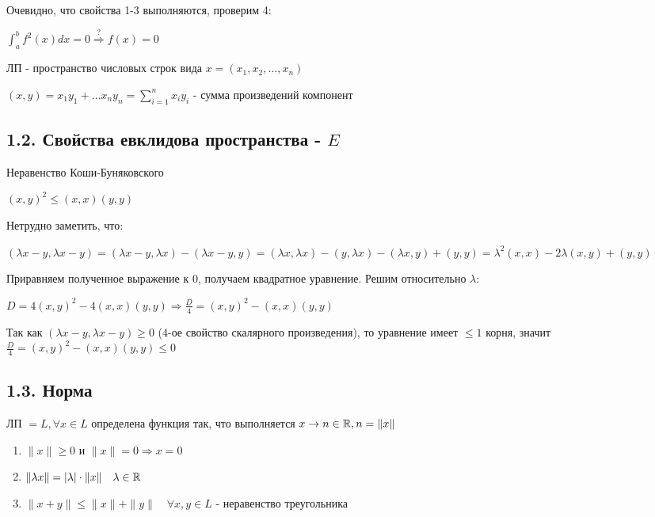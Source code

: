 \documentclass[12pt]{article}
\begin{document}
    Очевидно, что свойства 1-3 выполняются, проверим 4:

    $\int^b_a f^2(x) dx = 0 \stackrel{?}{\Longrightarrow} f(x) = 0$

     ЛП - пространство числовых строк вида $x = (x_1, x_2, \dots, x_n)$

    $(x, y) = x_1 y_1 + \dots x_n y_n = \sum_{i=1}^n x_i y_i$ - сумма произведений компонент

    \subsection{1.2. Свойства евклидова пространства - $E$}

    \hypertarget{inequalityofCauchyBunyakovsky}{}

    \begin{MyTheorem}
        \Ths Неравенство Коши-Буняковского

        $(x, y)^2 \leq (x, x)(y, y)$
    \end{MyTheorem}

    \begin{MyProof}
        Нетрудно заметить, что:

        $(\lambda x - y, \lambda x - y) = (\lambda x - y, \lambda x) - (\lambda x - y, y) =
        (\lambda x, \lambda x) - (y, \lambda x) - (\lambda x, y) + (y, y) = \lambda^2 (x, x) - 2\lambda (x, y) + (y, y)$

        Приравняем полученное выражение к 0, получаем квадратное уравнение. Решим относительно $\lambda$:

        $D = 4(x, y)^2 - 4(x, x)(y, y) \Longrightarrow \frac{D}{4} = (x, y)^2 - (x, x)(y, y)$

        Так как $(\lambda x - y, \lambda x - y) \geq 0$ (4-ое свойство скалярного произведения), то уравнение имеет $\leq 1$ корня, значит
        $\frac{D}{4} = (x, y)^2 - (x, x)(y, y) \leq 0$
    \end{MyProof}

    \subsection{1.3. Норма}

    \hypertarget{normdefinition}{}

    ЛП $= L, \forall x \in L$ определена функция так, что выполняется $x \to n \in \mathbb{R}, n = \|x\|$

    \begin{enumerate}
        \item $\|x\| \geq 0$ и $\|x\| = 0 \Longrightarrow x = 0$
        \item $\|\lambda x\| = |\lambda| \cdot \|x\| \quad \lambda \in \mathbb{R}$
        \item $\|x + y\| \leq \|x\| + \|y\| \quad \forall x, y \in L$ - неравенство треугольника
    \end{enumerate}
\end{document}
